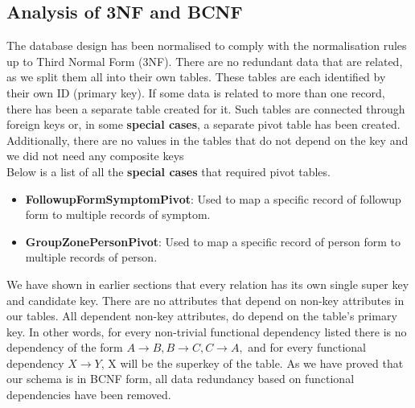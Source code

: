 \subsection{Analysis of 3NF and BCNF}
The database design has been normalised to comply with the normalisation rules up to Third Normal Form (3NF). There are no redundant data that are related, as we split them all into their own tables. These tables are each identified by their own ID (primary key). 
If some data is related to more than one record, there has been a separate table created for it. Such tables are connected through foreign keys or, in some \textbf{special cases}, a separate pivot table has been created. Additionally, there are no values in the tables that do not depend on the key and we did not need any composite keys\\
Below is a list of all the \textbf{special cases} that required pivot tables.
\begin{itemize}
    \item \textbf{FollowupFormSymptomPivot}: Used to map a specific record of followup form to multiple records of symptom.
    \item \textbf{GroupZonePersonPivot}: Used to map a specific record of person form to multiple records of person.
\end{itemize}
We have shown in earlier sections that every relation has its own single super key and candidate key. 
There are no attributes that depend on non-key attributes in our tables. All dependent non-key attributes, do depend on the table's primary key. In other words, for every non-trivial functional dependency listed there is no dependency of the form $A\rightarrow B, B \rightarrow C, C \rightarrow A,$ and for every functional dependency $X\rightarrow Y$, X will be the superkey of the table.
As we have proved that our schema is in BCNF form, all data redundancy based on functional dependencies have been removed.
